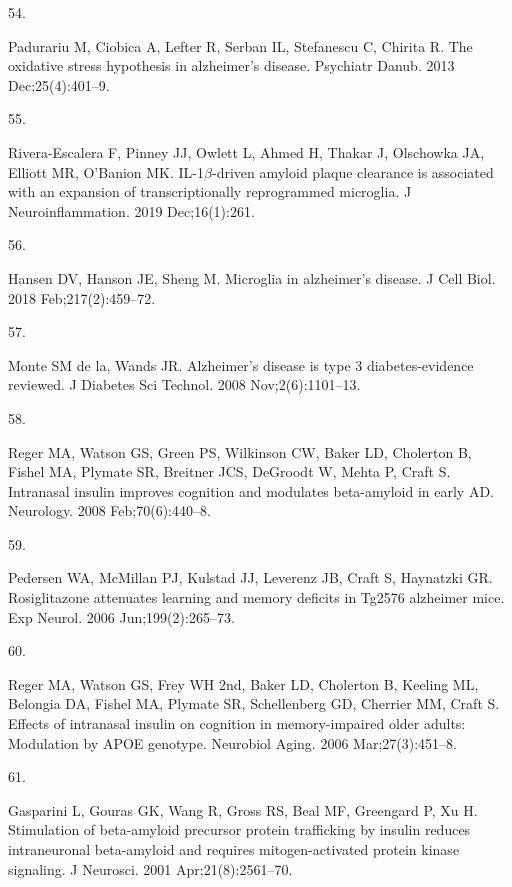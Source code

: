 \documentclass[
  a4paper,
]{article}
\newlength{\cslhangindent}
\newlength{\csllabelwidth}
\newlength{\cslentryspacingunit} %
\newenvironment{CSLReferences}[2] %
 {%
  \setlength{\parindent}{0pt}
  \ifodd #1
  \let\oldpar\par
  \def\par{\hangindent=\cslhangindent\oldpar}
  \fi
  \setlength{\parskip}{#2\cslentryspacingunit}
 }%
 {}
\newcommand{\CSLLeftMargin}[1]{\parbox[t]{\csllabelwidth}{#1}}
\newcommand{\CSLRightInline}[1]{\parbox[t]{\linewidth - \csllabelwidth}{#1}\break}
\begin{document}
\begin{CSLReferences}{0}{0}
\leavevmode{}%
\CSLLeftMargin{54. }%
\CSLRightInline{Padurariu M, Ciobica A, Lefter R, Serban IL, Stefanescu
C, Chirita R. The oxidative stress hypothesis in alzheimer's disease.
Psychiatr Danub. 2013 Dec;25(4):401--9. }

\leavevmode{}%
\CSLLeftMargin{55. }%
\CSLRightInline{Rivera-Escalera F, Pinney JJ, Owlett L, Ahmed H, Thakar
J, Olschowka JA, Elliott MR, O'Banion MK. {IL-1\(\beta\)-driven} amyloid
plaque clearance is associated with an expansion of transcriptionally
reprogrammed microglia. J Neuroinflammation. 2019 Dec;16(1):261. }

\leavevmode{}%
\CSLLeftMargin{56. }%
\CSLRightInline{Hansen DV, Hanson JE, Sheng M. Microglia in alzheimer's
disease. J Cell Biol. 2018 Feb;217(2):459--72. }

\leavevmode{}%
\CSLLeftMargin{57. }%
\CSLRightInline{Monte SM de la, Wands JR. Alzheimer's disease is type 3
diabetes-evidence reviewed. J Diabetes Sci Technol. 2008
Nov;2(6):1101--13. }

\leavevmode{}%
\CSLLeftMargin{58. }%
\CSLRightInline{Reger MA, Watson GS, Green PS, Wilkinson CW, Baker LD,
Cholerton B, Fishel MA, Plymate SR, Breitner JCS, DeGroodt W, Mehta P,
Craft S. Intranasal insulin improves cognition and modulates
beta-amyloid in early {AD}. Neurology. 2008 Feb;70(6):440--8. }

\leavevmode{}%
\CSLLeftMargin{59. }%
\CSLRightInline{Pedersen WA, McMillan PJ, Kulstad JJ, Leverenz JB, Craft
S, Haynatzki GR. Rosiglitazone attenuates learning and memory deficits
in Tg2576 alzheimer mice. Exp Neurol. 2006 Jun;199(2):265--73. }

\leavevmode{}%
\CSLLeftMargin{60. }%
\CSLRightInline{Reger MA, Watson GS, Frey WH 2nd, Baker LD, Cholerton B,
Keeling ML, Belongia DA, Fishel MA, Plymate SR, Schellenberg GD,
Cherrier MM, Craft S. Effects of intranasal insulin on cognition in
memory-impaired older adults: Modulation by {APOE} genotype. Neurobiol
Aging. 2006 Mar;27(3):451--8. }

\leavevmode{}%
\CSLLeftMargin{61. }%
\CSLRightInline{Gasparini L, Gouras GK, Wang R, Gross RS, Beal MF,
Greengard P, Xu H. Stimulation of beta-amyloid precursor protein
trafficking by insulin reduces intraneuronal beta-amyloid and requires
mitogen-activated protein kinase signaling. J Neurosci. 2001
Apr;21(8):2561--70. }


\end{CSLReferences}
\end{document}
